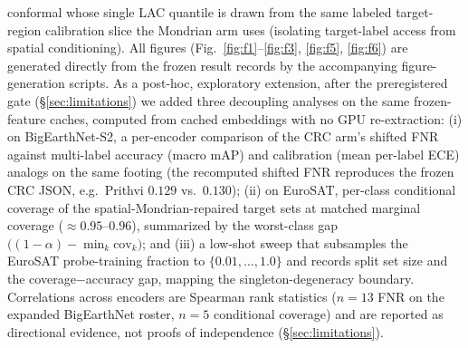 \documentclass[11pt]{article}
\begin{document}
conformal whose single LAC quantile is drawn from the same labeled target-region calibration slice
the Mondrian arm uses (isolating target-label access from spatial conditioning).
All figures (Fig.~\ref{fig:f1}--\ref{fig:f3}, \ref{fig:f5}, \ref{fig:f6}) are generated directly from the
frozen result records by the accompanying figure-generation scripts.
As a post-hoc, exploratory extension, after the preregistered gate
(\S\ref{sec:limitations}) we added three decoupling analyses on the same frozen-feature caches, computed
from cached embeddings with no GPU re-extraction: (i) on BigEarthNet-S2, a per-encoder comparison
of the CRC arm's shifted FNR against multi-label accuracy (macro mAP) and calibration (mean per-label
ECE) analogs on the same footing (the recomputed shifted FNR reproduces the frozen CRC JSON, e.g.\ Prithvi
$0.129$ vs.\ $0.130$); (ii) on EuroSAT, per-class conditional coverage of the spatial-Mondrian-repaired
target sets at matched marginal coverage ($\approx0.95$--$0.96$), summarized by the worst-class gap
$\big((1{-}\alpha)-\min_k \mathrm{cov}_k\big)$; and (iii) a low-shot sweep that subsamples the
EuroSAT probe-training fraction to $\{0.01,\dots,1.0\}$ and records split set size and the
coverage$-$accuracy gap, mapping the singleton-degeneracy boundary. Correlations across encoders are
Spearman rank statistics ($n{=}13$ FNR on the expanded BigEarthNet roster, $n{=}5$ conditional coverage)
and are reported as directional evidence, not proofs of independence (\S\ref{sec:limitations}).
\end{document}
